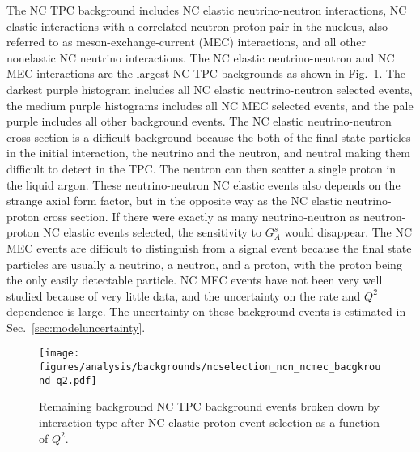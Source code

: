     The NC TPC background includes NC elastic neutrino-neutron interactions, NC
    elastic interactions with a correlated neutron-proton pair in the nucleus,
    also referred to as meson-exchange-current (MEC) interactions, and all
    other nonelastic NC neutrino interactions. The NC elastic neutrino-neutron
    and NC MEC interactions are the largest NC TPC backgrounds as shown in
    Fig.~\ref{fig:ncnmecbgs}. The darkest purple histogram includes all NC
    elastic neutrino-neutron selected events, the medium purple histograms
    includes all NC MEC selected events, and the pale purple includes all other
    background events. The NC elastic neutrino-neutron cross section is a
    difficult background because the both of the final state particles in the
    initial interaction, the neutrino and the neutron, and neutral making them
    difficult to detect in the TPC. The neutron can then scatter a single
    proton in the liquid argon. These neutrino-neutron NC elastic events also
    depends on the strange axial form factor, but in the opposite way as the NC
    elastic neutrino-proton cross section. If there were exactly as many
    neutrino-neutron as neutron-proton NC elastic events selected, the
    sensitivity to $G_A^s$ would disappear. The NC MEC events are difficult to
    distinguish from a signal event because the final state particles are
    usually a neutrino, a neutron, and a proton, with the proton being the only
    easily detectable particle. NC MEC events have not been very well studied
    because of very little data, and the uncertainty on the rate and $Q^2$
    dependence is large. The uncertainty on these background events is
    estimated in Sec.~\ref{sec:modeluncertainty}.
    \begin{figure}[ht]
      \centering
      \texttt{[image: figures/analysis/backgrounds/ncselection\_ncn\_ncmec\_bacgkround\_q2.pdf]}
      \caption{Remaining background NC TPC background events broken down by
      interaction type after NC elastic proton event selection as a function of
      $Q^2$.}
      \label{fig:ncnmecbgs}
    \end{figure}

